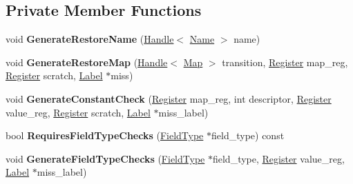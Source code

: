 \subsection*{Private Member Functions}
\begin{DoxyCompactItemize}
\item 
void {\bfseries Generate\+Restore\+Name} (\hyperlink{classv8_1_1internal_1_1_handle}{Handle}$<$ \hyperlink{classv8_1_1internal_1_1_name}{Name} $>$ name)\hypertarget{classv8_1_1internal_1_1_named_store_handler_compiler_a1f2dcd5e5089a77924eb9822b4241b78}{}\label{classv8_1_1internal_1_1_named_store_handler_compiler_a1f2dcd5e5089a77924eb9822b4241b78}

\item 
void {\bfseries Generate\+Restore\+Map} (\hyperlink{classv8_1_1internal_1_1_handle}{Handle}$<$ \hyperlink{classv8_1_1internal_1_1_map}{Map} $>$ transition, \hyperlink{structv8_1_1internal_1_1_register}{Register} map\+\_\+reg, \hyperlink{structv8_1_1internal_1_1_register}{Register} scratch, \hyperlink{classv8_1_1internal_1_1_label}{Label} $\ast$miss)\hypertarget{classv8_1_1internal_1_1_named_store_handler_compiler_ab2e87e051826894bad46c50d5f34e0dc}{}\label{classv8_1_1internal_1_1_named_store_handler_compiler_ab2e87e051826894bad46c50d5f34e0dc}

\item 
void {\bfseries Generate\+Constant\+Check} (\hyperlink{structv8_1_1internal_1_1_register}{Register} map\+\_\+reg, int descriptor, \hyperlink{structv8_1_1internal_1_1_register}{Register} value\+\_\+reg, \hyperlink{structv8_1_1internal_1_1_register}{Register} scratch, \hyperlink{classv8_1_1internal_1_1_label}{Label} $\ast$miss\+\_\+label)\hypertarget{classv8_1_1internal_1_1_named_store_handler_compiler_ad2805e45fb55c37113e8ee694fd73d64}{}\label{classv8_1_1internal_1_1_named_store_handler_compiler_ad2805e45fb55c37113e8ee694fd73d64}

\item 
bool {\bfseries Requires\+Field\+Type\+Checks} (\hyperlink{classv8_1_1internal_1_1_field_type}{Field\+Type} $\ast$field\+\_\+type) const \hypertarget{classv8_1_1internal_1_1_named_store_handler_compiler_adaa31d82218c4b23ffa85e1f4485b9ea}{}\label{classv8_1_1internal_1_1_named_store_handler_compiler_adaa31d82218c4b23ffa85e1f4485b9ea}

\item 
void {\bfseries Generate\+Field\+Type\+Checks} (\hyperlink{classv8_1_1internal_1_1_field_type}{Field\+Type} $\ast$field\+\_\+type, \hyperlink{structv8_1_1internal_1_1_register}{Register} value\+\_\+reg, \hyperlink{classv8_1_1internal_1_1_label}{Label} $\ast$miss\+\_\+label)\hypertarget{classv8_1_1internal_1_1_named_store_handler_compiler_a29b5ae88c67dc765099a9ca636a36b55}{}\label{classv8_1_1internal_1_1_named_store_handler_compiler_a29b5ae88c67dc765099a9ca636a36b55}

\end{DoxyCompactItemize}
